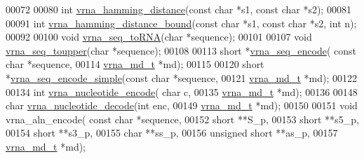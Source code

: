 \begin{DoxyCode}
00072 
00080 \textcolor{keywordtype}{int} \hyperlink{group__string__utils_ga301798b43b6f66687985c725efd14f32}{vrna\_hamming\_distance}(\textcolor{keyword}{const} \textcolor{keywordtype}{char} *s1, \textcolor{keyword}{const} \textcolor{keywordtype}{char} *s2);
00081 
00091 \textcolor{keywordtype}{int} \hyperlink{group__string__utils_ga5d1c2271e79d9bcb52d4e68360763fb9}{vrna\_hamming\_distance\_bound}(\textcolor{keyword}{const} \textcolor{keywordtype}{char} *s1, \textcolor{keyword}{const} \textcolor{keywordtype}{char} *s2, \textcolor{keywordtype}{int} n);
00092 
00100 \textcolor{keywordtype}{void} \hyperlink{group__string__utils_gacfed92cba77064f6c743f9118d079bfc}{vrna\_seq\_toRNA}(\textcolor{keywordtype}{char} *sequence);
00101 
00107 \textcolor{keywordtype}{void} \hyperlink{group__string__utils_ga4f44dca03c9d708d68e64c0610bb9091}{vrna\_seq\_toupper}(\textcolor{keywordtype}{char} *sequence);
00108 
00113 \textcolor{keywordtype}{short} *\hyperlink{group__string__utils_ga636e7d6f888fd639587296a5eddea660}{vrna\_seq\_encode}( \textcolor{keyword}{const} \textcolor{keywordtype}{char} *sequence,
00114                         \hyperlink{group__model__details_structvrna__md__s}{vrna\_md\_t} *md);
00115 
00120 \textcolor{keywordtype}{short} *\hyperlink{group__string__utils_ga3cd79d21d53248ad2634c1c0d43e97d7}{vrna\_seq\_encode\_simple}(\textcolor{keyword}{const} \textcolor{keywordtype}{char} *sequence,
00121                               \hyperlink{group__model__details_structvrna__md__s}{vrna\_md\_t} *md);
00122 
00134 \textcolor{keywordtype}{int} \hyperlink{group__string__utils_gac12bf00123f88621c9be847b0879c1fb}{vrna\_nucleotide\_encode}( \textcolor{keywordtype}{char} c,
00135                             \hyperlink{group__model__details_structvrna__md__s}{vrna\_md\_t} *md);
00136 
00148 \textcolor{keywordtype}{char} \hyperlink{group__string__utils_ga48ef585e697be9c8a08ed68c655e29b6}{vrna\_nucleotide\_decode}(\textcolor{keywordtype}{int} enc,
00149                             \hyperlink{group__model__details_structvrna__md__s}{vrna\_md\_t} *md);
00150 
00151 \textcolor{keywordtype}{void} vrna\_aln\_encode( \textcolor{keyword}{const} \textcolor{keywordtype}{char} *sequence,
00152                       \textcolor{keywordtype}{short} **S\_p,
00153                       \textcolor{keywordtype}{short} **s5\_p,
00154                       \textcolor{keywordtype}{short} **s3\_p,
00155                       \textcolor{keywordtype}{char} **ss\_p,
00156                       \textcolor{keywordtype}{unsigned} \textcolor{keywordtype}{short} **as\_p,
00157                       \hyperlink{group__model__details_structvrna__md__s}{vrna\_md\_t} *md);

\end{DoxyCode}
